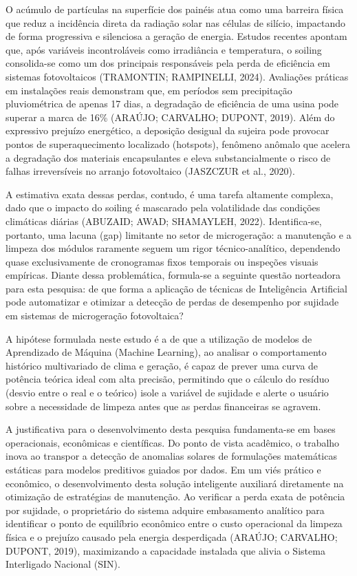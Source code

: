 \documentclass{UNESC}
\begin{document}
O acúmulo de partículas na superfície dos painéis atua como uma barreira física que reduz a incidência direta da radiação solar nas células de silício, impactando de forma progressiva e silenciosa a geração de energia. Estudos recentes apontam que, após variáveis incontroláveis como irradiância e temperatura, o soiling consolida-se como um dos principais responsáveis pela perda de eficiência em sistemas fotovoltaicos (TRAMONTIN; RAMPINELLI, 2024). Avaliações práticas em instalações reais demonstram que, em períodos sem precipitação pluviométrica de apenas 17 dias, a degradação de eficiência de uma usina pode superar a marca de 16\% (ARAÚJO; CARVALHO; DUPONT, 2019). Além do expressivo prejuízo energético, a deposição desigual da sujeira pode provocar pontos de superaquecimento localizado (hotspots), fenômeno anômalo que acelera a degradação dos materiais encapsulantes e eleva substancialmente o risco de falhas irreversíveis no arranjo fotovoltaico (JASZCZUR et al., 2020).

A estimativa exata dessas perdas, contudo, é uma tarefa altamente complexa, dado que o impacto do soiling é mascarado pela volatilidade das condições climáticas diárias (ABUZAID; AWAD; SHAMAYLEH, 2022). Identifica-se, portanto, uma lacuna (gap) limitante no setor de microgeração: a manutenção e a limpeza dos módulos raramente seguem um rigor técnico-analítico, dependendo quase exclusivamente de cronogramas fixos temporais ou inspeções visuais empíricas. Diante dessa problemática, formula-se a seguinte questão norteadora para esta pesquisa: de que forma a aplicação de técnicas de Inteligência Artificial pode automatizar e otimizar a detecção de perdas de desempenho por sujidade em sistemas de microgeração fotovoltaica?

A hipótese formulada neste estudo é a de que a utilização de modelos de Aprendizado de Máquina (Machine Learning), ao analisar o comportamento histórico multivariado de clima e geração, é capaz de prever uma curva de potência teórica ideal com alta precisão, permitindo que o cálculo do resíduo (desvio entre o real e o teórico) isole a variável de sujidade e alerte o usuário sobre a necessidade de limpeza antes que as perdas financeiras se agravem.

A justificativa para o desenvolvimento desta pesquisa fundamenta-se em bases operacionais, econômicas e científicas. Do ponto de vista acadêmico, o trabalho inova ao transpor a detecção de anomalias solares de formulações matemáticas estáticas para modelos preditivos guiados por dados. Em um viés prático e econômico, o desenvolvimento desta solução inteligente auxiliará diretamente na otimização de estratégias de manutenção. Ao verificar a perda exata de potência por sujidade, o proprietário do sistema adquire embasamento analítico para identificar o ponto de equilíbrio econômico entre o custo operacional da limpeza física e o prejuízo causado pela energia desperdiçada (ARAÚJO; CARVALHO; DUPONT, 2019), maximizando a capacidade instalada que alivia o Sistema Interligado Nacional (SIN).
\end{document}
